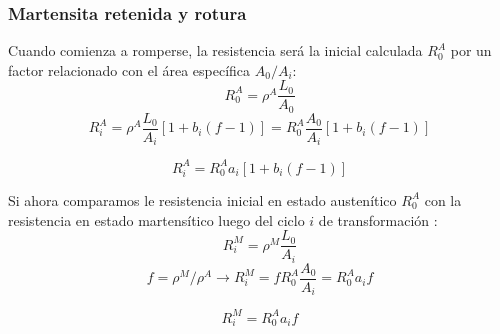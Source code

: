 \documentclass[usenames,dvipsnames]{beamer}
\begin{document}
\begin{frame}
 \frametitle{Martensita retenida y rotura}
 
Cuando comienza a romperse, la resistencia será la inicial calculada $R^A_0$ por un factor relacionado con el área específica $A_0/A_i$:
\begin{equation*}
 R^A _0 = \rho^A \frac{L_0}{A_0}
\end{equation*}
\begin{equation*}
 R^A _i =\rho^A \frac{L_0}{A_i} [1+ b_i (f-1)]= R^A _0 \frac{A_0}{A_i} [1+b_i (f-1)]  %
\end{equation*}

\begin{block}{
 \begin{equation*}
 R^A _i = R^A _0 a_i [1+b_i (f-1)] 
 \end{equation*}
 }
\end{block}


\end{frame}

\begin{frame}

Si ahora comparamos le resistencia inicial en estado austenítico $R^A _0$ con la resistencia en estado martensítico luego del ciclo $i$ de transformación :
\begin{equation*}
 R^M _i = \rho ^M \frac{L_0}{A_i}
\end{equation*}
\begin{equation*}
 f=\rho^M / \rho^A \longrightarrow
 R^M _i = f R^A _0 \frac{A_0}{A_i} = R^A _0 a_i f 
\end{equation*}

\begin{block}{
\begin{equation*}
 R^M _i  = R^A _0 a_i f
\end{equation*}
 }
\end{block}

\end{frame}
\end{document}
